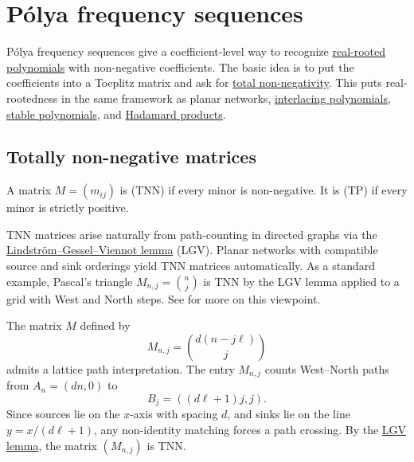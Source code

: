 


\section[polyaFrequency]{Pólya frequency sequences}

Pólya frequency sequences give a coefficient-level way to recognize
\hyperref[realRootedPolynomial]{real-rooted polynomials} with non-negative
coefficients.  The basic idea is to put the coefficients into a Toeplitz
matrix and ask for \hyperref[totallyNonnegative]{total non-negativity}.  This
puts real-rootedness in the
same framework as planar
networks, \hyperref[interlacingPolynomials]{interlacing polynomials},
\hyperref[stablePolynomial]{stable polynomials}, and
\hyperref[hadamardProduct]{Hadamard products}.

\subsection[totallyNonnegative]{Totally non-negative matrices}

A matrix \(M=(m_{ij})\) is
\label{totallyNonnegativeMatrix} (TNN) if every
minor is non-negative.  It is
\label{totallyPositiveMatrix} (TP) if every minor is
strictly positive.

TNN matrices arise naturally from path-counting in directed graphs via the
\hyperref[lgvLemma]{Lindström--Gessel--Viennot lemma} (LGV).  Planar networks
with compatible source and sink orderings yield TNN matrices automatically.
As a standard example, Pascal's triangle \(M_{n,j}=\binom{n}{j}\) is TNN by
the LGV lemma applied to a grid with West and North steps.
See \cite{ChenFuRuan2025x} for more on this viewpoint.

\begin{example*}
The matrix \(M\) defined by
\[
  M_{n,j} = \binom{d(n-j\ell)}{j}
\]
admits a lattice path interpretation.  The entry \(M_{n,j}\) counts
West--North paths from \(A_n=(dn,0)\) to
\[
  B_j=((d\ell+1)j,j).
\]
Since sources lie on the \(x\)-axis with spacing \(d\), and sinks lie on the
line \(y=x/(d\ell+1)\), any non-identity matching forces a path crossing.
By the \hyperref[lgvLemma]{LGV lemma}, the matrix \((M_{n,j})\) is TNN.
\end{example*}

